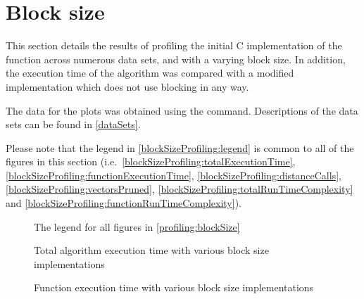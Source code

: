 


\section{Block size}
\label{profiling:blockSize}
This section details the results of profiling the initial C implementation of
the  function across numerous data sets, and
with a varying block size. In addition, the execution time of the algorithm was
compared with a modified implementation which does not use blocking in any way.

The data for the plots was obtained using the 
 command. Descriptions of the data sets can be found in
\autoref{dataSets}.


Please note that the legend in \autoref{blockSizeProfiling:legend} is common to
all of the figures in this section (i.e.\
\autoref{blockSizeProfiling:totalExecutionTime},
\autoref{blockSizeProfiling:functionExecutionTime},
\autoref{blockSizeProfiling:distanceCalls},
\autoref{blockSizeProfiling:vectorsPruned},
\autoref{blockSizeProfiling:totalRunTimeComplexity} and
\autoref{blockSizeProfiling:functionRunTimeComplexity}).

\begin{figure}[H]
    \centering
    
    \caption[Block size profiling legend]
        {The legend for all figures in \autoref{profiling:blockSize}}
    \label{blockSizeProfiling:legend}
\end{figure}

\begin{figure}[H]
    \centering
    
    \caption{Total algorithm execution time with various block size
        implementations}
    \label{blockSizeProfiling:totalExecutionTime}
\end{figure}

\begin{figure}[H]
    \centering
    
    \caption{Function execution time with various block size implementations}
    \label{blockSizeProfiling:functionExecutionTime}
\end{figure}

